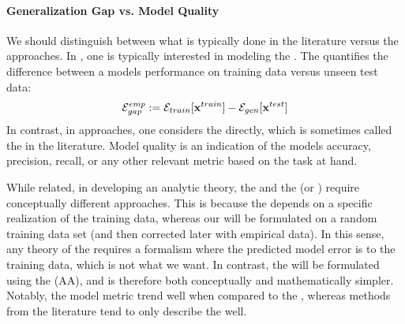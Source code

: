 \paragraph{Generalization Gap vs. Model Quality}
\label{sxn:SMOG_main-model_quality}

We should distinguish between what is typically done in the \SLT literature versus the \STATMECH approaches.
In \SLT, one is typically interested in modeling the \emph{\GeneralizationGap}.
The \GeneralizationGap quantifies the difference between a models performance on training data versus unseen test data:
\begin{align}
  \label{eqn:gen_gap}
  \mathcal{E}^{emp}_{gap}:= {\mathcal{E}}_{train}[\mathbf{x}^{train}]- {\mathcal{E}}_{gen}[\mathbf{x}^{test}]
\end{align}
In contrast, in \STATMECH approaches, one considers the \ModelGeneralizationError directly,
which is sometimes called the \ModelQuality in the \SLT literature.
Model quality is an indication of the models accuracy, precision, recall, or any other relevant metric based on the task at hand.

While related, in developing an analytic theory, the \GeneralizationGap and
the \ModelQuality (or \ModelGeneralizationError) require conceptually different approaches.
This is because the \GeneralizationGap depends on a specific realization of the training data,
whereas our \ModelGeneralizationError will be formulated on a random training data set
(and then corrected later with empirical data).
In this sense, any theory of the \GeneralizationGap  requires a formalism where the
predicted model error is \Quenched to the training data, which is not what we want.
In contrast, the \ModelGeneralizationError  will be formulated using the \AnnealedApproximation (AA),
and is therefore both conceptually and mathematically simpler.
Notably, the \HTSR model \Quality metric trend well when compared to the \ModelGeneralizationError ,
whereas methods from the \SLT literature tend to only describe the \GeneralizationGap well.\cite{YTHx23_KDD}
